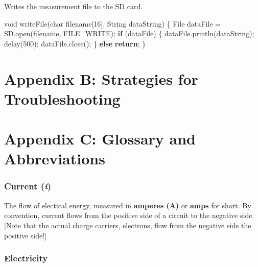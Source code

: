 \documentclass[]{book}
\newenvironment{Shaded}{\begin{snugshade}}{\end{snugshade}}
\newcommand{\ControlFlowTok}[1]{\textcolor[rgb]{0.13,0.29,0.53}{\textbf{#1}}}
\newcommand{\DataTypeTok}[1]{\textcolor[rgb]{0.13,0.29,0.53}{#1}}
\newcommand{\DecValTok}[1]{\textcolor[rgb]{0.00,0.00,0.81}{#1}}
\newcommand{\NormalTok}[1]{#1}
\begin{document}
Writes the measurement file to the SD card.

\begin{Shaded}
\begin{Highlighting}[]
\DataTypeTok{void}\NormalTok{ writeFile(}\DataTypeTok{char}\NormalTok{ filename[}\DecValTok{16}\NormalTok{], String dataString) \{}
\NormalTok{    File dataFile = SD.open(filename, FILE_WRITE);}
    \ControlFlowTok{if}\NormalTok{ (dataFile) \{}
\NormalTok{        dataFile.println(dataString);}
\NormalTok{        delay(}\DecValTok{500}\NormalTok{);}
\NormalTok{        dataFile.close();}
\NormalTok{     \}}
     \ControlFlowTok{else} \ControlFlowTok{return}\NormalTok{;}
\NormalTok{\}}
\end{Highlighting}
\end{Shaded}

\hypertarget{appendix-b-strategies-for-troubleshooting}{%
\chapter*{Appendix B: Strategies for Troubleshooting}\label{appendix-b-strategies-for-troubleshooting}}

\hypertarget{appendix-c-glossary-and-abbreviations}{%
\chapter*{Appendix C: Glossary and Abbreviations}\label{appendix-c-glossary-and-abbreviations}}

\hypertarget{current-i}{%
\subsection*{\texorpdfstring{Current (\emph{i})}{Current (i)}}\label{current-i}}

The flow of electical energy, measured in \textbf{amperes (A)} or \textbf{amps} for short. By convention, current flows from the positive side of a circuit to the negative side. {[}Note that the actual charge carriers, electrons, flow from the negative side the positive side!{]}

\hypertarget{electricity-1}{%
\subsection*{Electricity}\label{electricity-1}}
\end{document}
